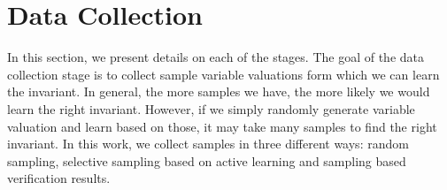 
\section{Data Collection} %
\label{sec:sampling}
In this section, we present details on each of the stages. The goal of the data collection stage is to collect sample variable valuations form which we can learn the invariant. In general, the more samples we have, the more likely we would learn the right invariant. However, if we simply randomly generate variable valuation and learn based on those, it may take many samples to find the right invariant. In this work, we collect samples in three different ways: random sampling, selective sampling based on active learning and sampling based verification results.



